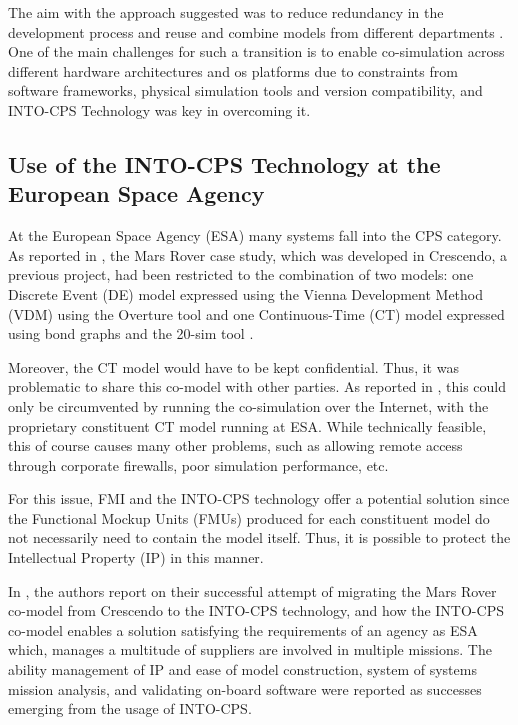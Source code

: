 The aim with the approach suggested was to reduce redundancy in the
development process and reuse and combine models from different
departments \cite{Pedersen&17}. One of the main challenges for such a transition
is to enable co-simulation across different hardware architectures and \ac{os}
platforms due to constraints from software frameworks, physical simulation
tools and version compatibility, and INTO-CPS Technology was key in overcoming
it.

\subsection{Use of the INTO-CPS Technology at the European Space Agency}


At the European Space Agency (ESA) many systems fall into the CPS category.  As
reported in \cite{Feo-Arenis&17}, the Mars Rover case study, which was
developed in Crescendo, a previous project, had been restricted to the
combination of two models:  one Discrete Event (DE) model expressed using the
Vienna Development Method (VDM) \cite{Fitzgerald&08c} using the Overture tool
\cite{Larsen&10a} and one Continuous-Time (CT) model expressed using bond graphs
\cite{Karnopp&68} and the 20-sim tool \cite{Kleijn06}. 

Moreover, the CT model would have to be kept confidential.  Thus, it was
problematic to share this co-model with other parties.  As reported in
\cite{Feo-Arenis&17}, this could only be circumvented by running the
co-simulation over the Internet, with the proprietary constituent CT model
running at ESA. While technically feasible, this of course causes many other
problems, such as allowing remote access through corporate firewalls, poor
simulation performance, etc.

For this issue, FMI and the INTO-CPS technology offer a potential solution since
the Functional Mockup Units (FMUs) produced for each constituent model do not
necessarily need to contain the model itself. Thus, it is possible to protect
the Intellectual Property (IP) in this manner. 

In \cite{Feo-Arenis&17}, the authors report on their successful attempt of
migrating the Mars Rover co-model from Crescendo to the INTO-CPS technology,
and how the INTO-CPS co-model enables a solution satisfying the requirements of
an agency as ESA which, manages a multitude of suppliers are involved in
multiple  missions. The ability management of IP and ease of model
construction, system of systems mission analysis, and validating on-board
software were reported as successes emerging from the usage of INTO-CPS.


